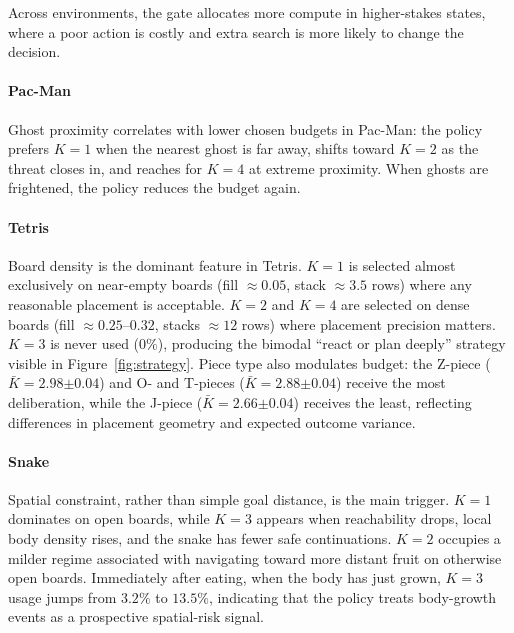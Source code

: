 Across environments, the gate allocates more compute in higher-stakes
states, where a poor action is costly and extra search is more likely
to change the decision.

\paragraph{Pac-Man}

Ghost proximity correlates with lower chosen budgets in Pac-Man: the
policy prefers $K{=}1$ when the nearest ghost is far away, shifts
toward $K{=}2$ as the threat closes in, and reaches for $K{=}4$ at
extreme proximity. When ghosts are frightened, the policy reduces the
budget again.

\paragraph{Tetris}

Board density is the dominant feature in Tetris.
$K{=}1$ is selected almost exclusively on near-empty boards
(fill $\approx 0.05$, stack $\approx 3.5$ rows) where any reasonable placement is
acceptable.
$K{=}2$ and $K{=}4$ are selected on dense boards (fill
$\approx 0.25$--$0.32$, stacks $\approx 12$ rows) where placement
precision matters.
$K{=}3$ is never used ($0\%$), producing the bimodal ``react or plan deeply'' strategy
visible in Figure~\ref{fig:strategy}.
Piece type also modulates budget: the Z-piece ($\bar{K}{=}2.98{\scriptstyle\pm0.04}$)
and O- and T-pieces ($\bar{K}{=}2.88{\scriptstyle\pm0.04}$) receive the most
deliberation, while the J-piece ($\bar{K}{=}2.66{\scriptstyle\pm0.04}$) receives the
least, reflecting differences in placement geometry and expected outcome variance.

\paragraph{Snake}

Spatial constraint, rather than simple goal distance, is the main
trigger.
$K{=}1$ dominates on open boards, while $K{=}3$ appears when reachability drops,
local body density rises, and the snake has fewer safe continuations. $K{=}2$
occupies a milder regime associated with navigating toward more distant fruit on
otherwise open boards. Immediately after eating, when the body has just grown,
$K{=}3$ usage jumps from $3.2\%$ to $13.5\%$, indicating that the policy treats
body-growth events as a prospective spatial-risk signal.

